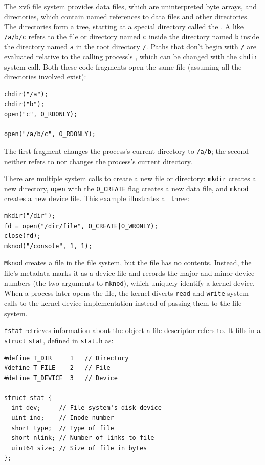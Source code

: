 The xv6 file system provides data files,
which are uninterpreted byte arrays,
and directories, which
contain named references to data files and other directories.
The directories form a tree, starting
at a special directory called the 
.
A 
like
\lstinline{/a/b/c}
refers to the file or directory named
\lstinline{c}
inside the directory named
\lstinline{b}
inside the directory named
\lstinline{a}
in the root directory
\lstinline{/}.
Paths that don't begin with
\lstinline{/}
are evaluated relative to the calling process's
,
which can be changed with the
\lstinline{chdir}
system call.
Both these code fragments open the same file
(assuming all the directories involved exist):
\begin{lstlisting}[]
chdir("/a");
chdir("b");
open("c", O_RDONLY);

open("/a/b/c", O_RDONLY);
\end{lstlisting}
The first fragment changes the process's current directory to
\lstinline{/a/b};
the second neither refers to nor changes the process's current directory.


There are multiple system calls to create a new file or directory:
\lstinline{mkdir}
creates a new directory,
\lstinline{open}
with the
\lstinline{O_CREATE}
flag creates a new data file,
and
\lstinline{mknod}
creates a new device file.
This example illustrates all three:
\begin{lstlisting}[]
mkdir("/dir");
fd = open("/dir/file", O_CREATE|O_WRONLY);
close(fd);
mknod("/console", 1, 1);
\end{lstlisting}
\lstinline{Mknod}
creates a file in the file system,
but the file has no contents.
Instead, the file's metadata marks it as a device file
and records the major and minor device numbers
(the two arguments to 
\lstinline{mknod}),
which uniquely identify a kernel device.
When a process later opens the file, the kernel
diverts
\lstinline{read}
and
\lstinline{write}
system calls to the kernel device implementation
instead of passing them to the file system.

\lstinline{fstat}
retrieves information about the object a file
descriptor refers to.
It fills in a
\lstinline{struct}
\lstinline{stat},
defined in
\lstinline{stat.h}
as:
\begin{lstlisting}[]
#define T_DIR     1   // Directory
#define T_FILE    2   // File
#define T_DEVICE  3   // Device

struct stat {
  int dev;     // File system's disk device
  uint ino;    // Inode number
  short type;  // Type of file
  short nlink; // Number of links to file
  uint64 size; // Size of file in bytes
};
\end{lstlisting}

